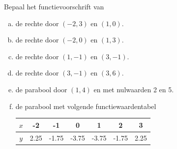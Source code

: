 \documentclass[12pt]{article}
\begin{document}
\begin{oefening}
Bepaal het functievoorschrift van
\begin{enumerate}[(a)]
  \itemsep.5em
  \item de rechte door $(-2, 3)$ en $(1, 0)$.
  \item de rechte door $(-2, 0)$ en $(1, 3)$.
  \item de rechte door $(1, -1)$ en $(3, -1)$.
  \item de rechte door $(3, -1)$ en $(3, 6)$.
  \item de parabool door $(1,4)$ en met nulwaarden 2 en 5.
  \item de parabool met volgende functiewaardentabel
  \begin{center}
    \begin{tabular}{c|cccccc}
    $x$ & -2 & -1 & 0 & 1 & 2 & 3\\
    \hline
    $y$ & 2.25 & -1.75 & -3.75 & -3.75 & -1.75 & 2.25
    \end{tabular}
  \end{center}
\end{enumerate}
\end{oefening}
\end{document}
